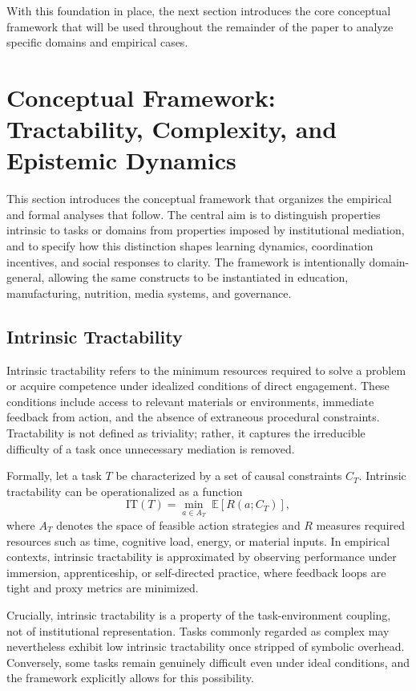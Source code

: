 \documentclass[11pt]{article}
\begin{document}
With this foundation in place, the next section introduces the core conceptual framework that will be used throughout the remainder of the paper to analyze specific domains and empirical cases.

\section{Conceptual Framework: Tractability, Complexity, and Epistemic Dynamics}

This section introduces the conceptual framework that organizes the empirical and formal analyses that follow. The central aim is to distinguish properties intrinsic to tasks or domains from properties imposed by institutional mediation, and to specify how this distinction shapes learning dynamics, coordination incentives, and social responses to clarity. The framework is intentionally domain-general, allowing the same constructs to be instantiated in education, manufacturing, nutrition, media systems, and governance.

\subsection{Intrinsic Tractability}

Intrinsic tractability refers to the minimum resources required to solve a problem or acquire competence under idealized conditions of direct engagement. These conditions include access to relevant materials or environments, immediate feedback from action, and the absence of extraneous procedural constraints. Tractability is not defined as triviality; rather, it captures the irreducible difficulty of a task once unnecessary mediation is removed.

Formally, let a task \(T\) be characterized by a set of causal constraints \(C_T\). Intrinsic tractability can be operationalized as a function
\[
\mathrm{IT}(T) = \min_{a \in A_T} \; \mathbb{E}[R(a; C_T)],
\]
where \(A_T\) denotes the space of feasible action strategies and \(R\) measures required resources such as time, cognitive load, energy, or material inputs. In empirical contexts, intrinsic tractability is approximated by observing performance under immersion, apprenticeship, or self-directed practice, where feedback loops are tight and proxy metrics are minimized.

Crucially, intrinsic tractability is a property of the task-environment coupling, not of institutional representation. Tasks commonly regarded as complex may nevertheless exhibit low intrinsic tractability once stripped of symbolic overhead. Conversely, some tasks remain genuinely difficult even under ideal conditions, and the framework explicitly allows for this possibility.
\end{document}
